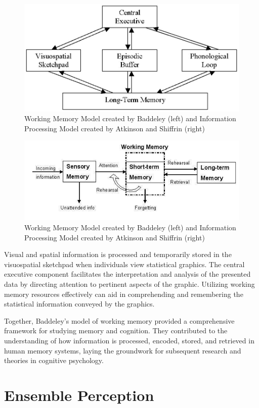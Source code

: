 \documentclass[print]{nuthesis}
\begin{document}
\begin{figure}

{\centering \includegraphics[width=0.45\linewidth]{figure/Baddeley_model} 

}

\caption{Working Memory Model created by Baddeley (left) and Information Processing Model created by Atkinson and Shiffrin (right)}\label{fig:unnamed-chunk-4-1}
\end{figure}
\begin{figure}

{\centering \includegraphics[width=0.45\linewidth]{figure/info_model} 

}

\caption{Working Memory Model created by Baddeley (left) and Information Processing Model created by Atkinson and Shiffrin (right)}\label{fig:unnamed-chunk-4-2}
\end{figure}

Visual and spatial information is processed and temporarily stored in the visuospatial sketchpad when individuals view statistical graphics.
The central executive component facilitates the interpretation and analysis of the presented data by directing attention to pertinent aspects of the graphic.
Utilizing working memory resources effectively can aid in comprehending and remembering the statistical information conveyed by the graphics.

Together, Baddeley's model of working memory provided a comprehensive framework for studying memory and cognition.
They contributed to the understanding of how information is processed, encoded, stored, and retrieved in human memory systems, laying the groundwork for subsequent research and theories in cognitive psychology.

\hypertarget{ensemble-perception}{%
\section{Ensemble Perception}\label{ensemble-perception}}
\end{document}
